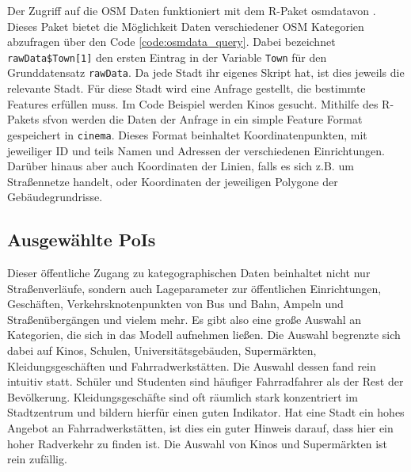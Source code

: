 \documentclass[a4paper,12pt]{thesis}
\begin{document}
Der Zugriff auf die OSM Daten funktioniert mit dem R-Paket \glqq osmdata\grqq von \cite{Padgham2017}. Dieses Paket bietet die Möglichkeit Daten verschiedener OSM Kategorien abzufragen über den Code \ref{code:osmdata_query}. Dabei bezeichnet \lstinline|rawData$Town[1]| den ersten Eintrag in der Variable \lstinline|Town| für den Grunddatensatz \lstinline|rawData|. Da jede Stadt ihr eigenes Skript hat, ist dies jeweils die relevante Stadt. Für diese Stadt wird eine Anfrage gestellt, die bestimmte Features erfüllen muss. Im Code Beispiel werden Kinos gesucht. Mithilfe des R-Pakets \glqq sf\grqq von \cite{Pebesma2018} werden die Daten der Anfrage in ein simple Feature Format gespeichert in \lstinline|cinema|. Dieses Format beinhaltet Koordinatenpunkten, mit jeweiliger ID und teils Namen und Adressen der verschiedenen Einrichtungen. Darüber hinaus aber auch Koordinaten der Linien, falls es sich z.B. um Straßennetze handelt, oder Koordinaten der jeweiligen Polygone der Gebäudegrundrisse.


\subsection{Ausgewählte PoIs}

Dieser öffentliche Zugang zu kategographischen Daten beinhaltet nicht nur Straßenverläufe, sondern auch Lageparameter zur öffentlichen Einrichtungen, Geschäften, Verkehrsknotenpunkten von Bus und Bahn, Ampeln und Straßenübergängen und vielem mehr. Es gibt also eine große Auswahl an Kategorien, die sich in das Modell aufnehmen ließen. Die Auswahl begrenzte sich dabei auf Kinos, Schulen, Universitätsgebäuden, Supermärkten, Kleidungsgeschäften und Fahrradwerkstätten. Die Auswahl dessen fand rein intuitiv statt. Schüler und Studenten sind häufiger Fahrradfahrer als der Rest der Bevölkerung. Kleidungsgeschäfte sind oft räumlich stark konzentriert im Stadtzentrum und bildern hierfür einen guten Indikator. Hat eine Stadt ein hohes Angebot an Fahrradwerkstätten, ist dies ein guter Hinweis darauf, dass hier ein hoher Radverkehr zu finden ist. Die Auswahl von Kinos und Supermärkten ist rein zufällig.\\
\end{document}
